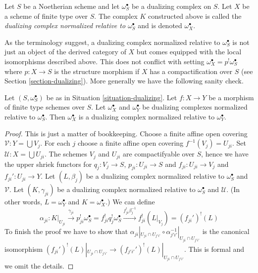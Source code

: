 \begin{definition}
\label{definition-good-dualizing}
Let $S$ be a Noetherian scheme and let $\omega_S^\bullet$ be a dualizing
complex on $S$. Let $X$ be a scheme of finite type over $S$.
The complex $K$ constructed above is called the
{\it dualizing complex normalized relative to $\omega_S^\bullet$}
and is denoted $\omega_X^\bullet$.
\end{definition}

\noindent
As the terminology suggest, a dualizing complex normalized relative to
$\omega_S^\bullet$ is not just an object of the derived category of $X$
but comes equipped with the local isomorphisms described above.
This does not conflict with setting
$\omega_X^\bullet = p^!\omega_S^\bullet$ where $p : X \to S$ is the
structure morphism if $X$ has a compactification over $S$ (see
Section \ref{section-dualizing}). More generally
we have the following sanity check.

\begin{lemma}
\label{lemma-good-over-both}
Let $(S, \omega_S^\bullet)$ be as in Situation \ref{situation-dualizing}.
Let $f : X \to Y$ be a morphism of finite type schemes over $S$.
Let $\omega_X^\bullet$ and $\omega_Y^\bullet$ be dualizing complexes
normalized relative to $\omega_S^\bullet$. Then $\omega_X^\bullet$
is a dualizing complex normalized relative to $\omega_Y^\bullet$.
\end{lemma}

\begin{proof}
This is just a matter of bookkeeping.
Choose a finite affine open covering $\mathcal{V} : Y = \bigcup V_j$.
For each $j$ choose a finite affine open covering $f^{-1}(V_j) = U_{ji}$.
Set $\mathcal{U} : X = \bigcup U_{ji}$. The schemes $V_j$ and $U_{ji}$ are
compactifyable over $S$, hence we have the upper shriek functors for
$q_j : V_j \to S$, $p_{ji} : U_{ji} \to S$ and
$f_{ji} : U_{ji} \to V_j$ and $f_{ji}' : U_{ji} \to Y$.
Let $(L, \beta_j)$ be a dualizing complex normalized relative to
$\omega_S^\bullet$ and $\mathcal{V}$.
Let $(K, \gamma_{ji})$ be a dualizing complex normalized relative to
$\omega_S^\bullet$ and $\mathcal{U}$.
(In other words, $L = \omega_Y^\bullet$ and $K = \omega_X^\bullet$.)
We can define
$$
\alpha_{ji} :
K|_{U_{ji}} \xrightarrow{\gamma_{ji}}
p_{ji}^!\omega_S^\bullet = f_{ji}^!q_j^!\omega_S^\bullet
\xrightarrow{f_{ji}^!\beta_j^{-1}} f_{ji}^!(L|_{V_j}) =
(f_{ji}')^!(L)
$$
To finish the proof we have to show that
$\alpha_{ji}|_{U_{ji} \cap U_{j'i'}}
\circ \alpha_{j'i'}^{-1}|_{U_{ji} \cap U_{j'i'}}$
is the canonical isomorphism
$(f_{ji}')^!(L)|_{U_{ji} \cap U_{j'i'}} \to
(f_{j'i'}')^!(L)|_{U_{ji} \cap U_{j'i'}}$. This is formal and we
omit the details.
\end{proof}

